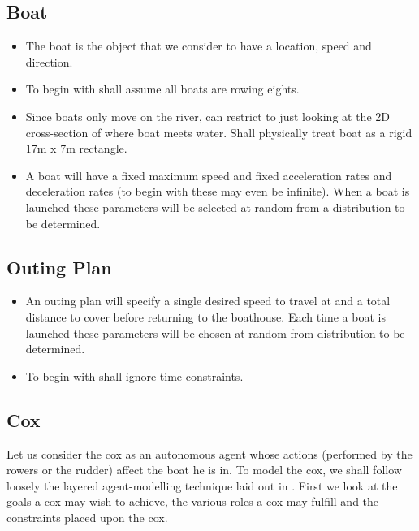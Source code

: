\subsection{Boat}
\begin{itemize}
  \item The boat is the object that we consider to have a location, speed and direction.
  \item To begin with shall assume all boats are rowing eights.
  \item Since boats only move on the river, can restrict to just looking at the 2D cross-section of where boat
    meets water. Shall physically treat boat as a rigid 17m x 7m rectangle.
  \item A boat will have a fixed maximum speed and fixed acceleration
    rates and deceleration rates (to begin with these may even be
    infinite). When a boat is launched these parameters will be
    selected at random from a distribution to be determined.
\end{itemize}

\subsection{Outing Plan}
\begin{itemize}
  \item An outing plan will specify a single desired speed to travel at
    and a total distance to cover before returning to the
    boathouse. Each time a boat is launched these parameters will be
    chosen at random from distribution to be determined.
  \item To begin with shall ignore time constraints.
\end{itemize}

\subsection{Cox}
Let us consider the cox as an autonomous agent whose actions
(performed by the rowers or the rudder) affect the boat he is in. To
model the cox, we shall follow loosely the layered agent-modelling
technique laid out in \cite{Sterling2009}. First we look at the
goals a cox may wish to achieve, the various roles a cox may fulfill
and the constraints placed upon the cox.

